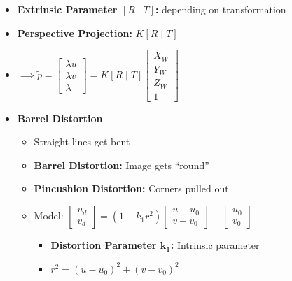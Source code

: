 \documentclass[a4paper]{article}
\newcommand{\ides}[1]{\item \textbf{#1}}
\begin{document}
\begin{itemize}
    \ides{Extrinsic Parameter $[R \mid T]$:} depending on transformation
    \ides{Perspective Projection:} $K[R \mid T]$
    \item $\implies \tilde p =
        \begin{bmatrix}
            \lambda u\\
            \lambda v\\
            \lambda
        \end{bmatrix} = K[R \mid T]
        \begin{bmatrix}
            X_W\\
            Y_W\\
            Z_W\\
            1
        \end{bmatrix}$
    \ides{Barrel Distortion}
        \begin{itemize}
            \item Straight lines get bent
            \ides{Barrel Distortion:} Image gets ``round''
            \ides{Pincushion Distortion:} Corners pulled out
            \item Model:
                $\begin{bmatrix}
                    u_d\\
                    v_d
                \end{bmatrix} = (1 + k_1 r^2)
                \begin{bmatrix}
                    u - u_0\\
                    v - v_0
                \end{bmatrix} +
                \begin{bmatrix}
                    u_0\\
                    v_0
                \end{bmatrix}$
                \begin{itemize}
                    \ides{Distortion Parameter $\mathbf{k_1}$:} Intrinsic parameter
                    \item $r^2 = (u - u_0)^2 + (v - v_0)^2$
                \end{itemize}
        \end{itemize}
\end{itemize}
\end{document}
